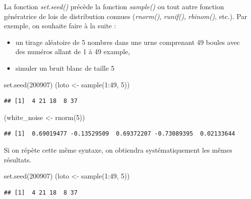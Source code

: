 \documentclass[
]{book}
\newenvironment{Shaded}{\begin{snugshade}}{\end{snugshade}}
\newcommand{\DecValTok}[1]{\textcolor[rgb]{0.00,0.00,0.81}{#1}}
\newcommand{\FunctionTok}[1]{\textcolor[rgb]{0.00,0.00,0.00}{#1}}
\newcommand{\NormalTok}[1]{#1}
\newcommand{\OtherTok}[1]{\textcolor[rgb]{0.56,0.35,0.01}{#1}}
\newcommand{\SpecialCharTok}[1]{\textcolor[rgb]{0.00,0.00,0.00}{#1}}
\providecommand{\tightlist}{%
  \setlength{\itemsep}{0pt}\setlength{\parskip}{0pt}}
\theoremstyle{definition}
\theoremstyle{definition}
\theoremstyle{definition}
\theoremstyle{definition}
\theoremstyle{remark}
\begin{document}
La fonction \emph{set.seed()} précède la fonction \emph{sample()} ou tout autre fonction génératrice de lois de distribution connues (\emph{rnorm()}, \emph{runif()}, \emph{rbinom()}, etc.). Par exemple, on souhaite faire à la suite :

\begin{itemize}
\tightlist
\item
  un tirage aléatoire de 5 nombres dans une urne comprenant 49 boules avec des numéros allant de 1 à 49 example,
\item
  simuler un bruit blanc de taille 5
\end{itemize}

\begin{Shaded}
\begin{Highlighting}[]
\FunctionTok{set.seed}\NormalTok{(}\DecValTok{200907}\NormalTok{)}
\NormalTok{(loto }\OtherTok{\textless{}{-}} \FunctionTok{sample}\NormalTok{(}\DecValTok{1}\SpecialCharTok{:}\DecValTok{49}\NormalTok{, }\DecValTok{5}\NormalTok{))}
\end{Highlighting}
\end{Shaded}

\begin{verbatim}
## [1]  4 21 18  8 37
\end{verbatim}

\begin{Shaded}
\begin{Highlighting}[]
\NormalTok{(white\_noise }\OtherTok{\textless{}{-}} \FunctionTok{rnorm}\NormalTok{(}\DecValTok{5}\NormalTok{))}
\end{Highlighting}
\end{Shaded}

\begin{verbatim}
## [1]  0.69019477 -0.13529509  0.69372207 -0.73089395  0.02133644
\end{verbatim}

Si on répète cette même syntaxe, on obtiendra systématiquement les mêmes résultats.

\begin{Shaded}
\begin{Highlighting}[]
\FunctionTok{set.seed}\NormalTok{(}\DecValTok{200907}\NormalTok{)}
\NormalTok{(loto }\OtherTok{\textless{}{-}} \FunctionTok{sample}\NormalTok{(}\DecValTok{1}\SpecialCharTok{:}\DecValTok{49}\NormalTok{, }\DecValTok{5}\NormalTok{))}
\end{Highlighting}
\end{Shaded}

\begin{verbatim}
## [1]  4 21 18  8 37
\end{verbatim}
\end{document}
